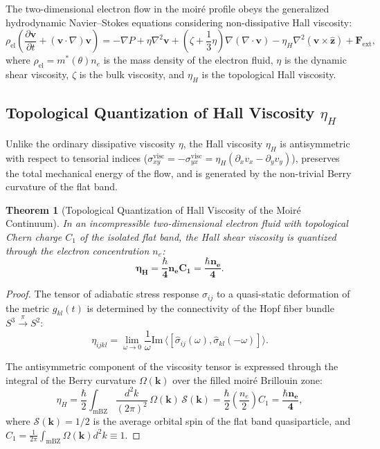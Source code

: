 \documentclass[12pt,a4paper]{article}
\newtheorem{theorem}{Theorem}
\begin{document}
The two-dimensional electron flow in the moiré profile obeys the generalized hydrodynamic Navier--Stokes equations considering non-dissipative Hall viscosity:
\begin{equation}
\rho_{\text{el}} \left( \frac{\partial \mathbf{v}}{\partial t} + (\mathbf{v} \cdot \nabla)\mathbf{v} \right) = -\nabla P + \eta \nabla^2 \mathbf{v} + \left( \zeta + \frac{1}{3}\eta \right) \nabla(\nabla \cdot \mathbf{v}) - \eta_H \nabla^2 (\mathbf{v} \times \hat{\mathbf{z}}) + \mathbf{F}_{\text{ext}},
\end{equation}
where $\rho_{\text{el}} = m^*(\theta) n_e$ is the mass density of the electron fluid, $\eta$ is the dynamic shear viscosity, $\zeta$ is the bulk viscosity, and $\eta_H$ is the topological Hall viscosity.
									
\subsection{Topological Quantization of Hall Viscosity $\eta_H$}
Unlike the ordinary dissipative viscosity $\eta$, the Hall viscosity $\eta_H$ is antisymmetric with respect to tensorial indices ($\sigma_{xy}^{\text{visc}} = -\sigma_{yx}^{\text{visc}} = \eta_H (\partial_x v_x - \partial_y v_y)$), preserves the total mechanical energy of the flow, and is generated by the non-trivial Berry curvature of the flat band.
									
\begin{theorem}[Topological Quantization of Hall Viscosity of the Moiré Continuum]
In an incompressible two-dimensional electron fluid with topological Chern charge $C_1$ of the isolated flat band, the Hall shear viscosity is quantized through the electron concentration $n_e$:
\begin{equation}
\mathbf{\eta_H = \frac{\hbar}{4} n_e C_1 = \frac{\hbar n_e}{4}}.
\end{equation}
\end{theorem}
									
\begin{proof}
The tensor of adiabatic stress response $\sigma_{ij}$ to a quasi-static deformation of the metric $g_{kl}(t)$ is determined by the connectivity of the Hopf fiber bundle $S^3 \xrightarrow{\pi} S^2$:
\begin{equation}
\eta_{ijkl} = \lim_{\omega \to 0} \frac{1}{\omega} \mathrm{Im} \, \langle [ \hat{\sigma}_{ij}(\omega), \hat{\sigma}_{kl}(-\omega) ] \rangle.
\end{equation}
										
The antisymmetric component of the viscosity tensor is expressed through the integral of the Berry curvature $\Omega(\mathbf{k})$ over the filled moiré Brillouin zone:
\begin{equation}
\eta_H = \frac{\hbar}{2} \int_{\text{mBZ}} \frac{d^2k}{(2\pi)^2} \, \Omega(\mathbf{k}) \, \mathcal{S}(\mathbf{k}) = \frac{\hbar}{2} \left( \frac{n_e}{2} \right) C_1 = \mathbf{\frac{\hbar n_e}{4}},
\end{equation}
where $\mathcal{S}(\mathbf{k}) = 1/2$ is the average orbital spin of the flat band quasiparticle, and $C_1 = \frac{1}{2\pi}\int_{\text{mBZ}} \Omega(\mathbf{k}) d^2k \equiv 1$.
\end{proof}
									
\end{document}
